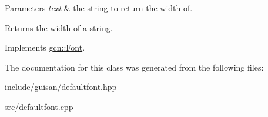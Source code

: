 \begin{DoxyParams}{Parameters}
{\em text} & the string to return the width of. \\
\hline
\end{DoxyParams}
\begin{DoxyReturn}{Returns}
the width of a string. 
\end{DoxyReturn}


Implements \hyperlink{classgcn_1_1Font_abb88894b1ebeda28edcac75c537f8e0f}{gcn\+::\+Font}.



The documentation for this class was generated from the following files\+:\begin{DoxyCompactItemize}
\item 
include/guisan/defaultfont.\+hpp\item 
src/defaultfont.\+cpp\end{DoxyCompactItemize}
